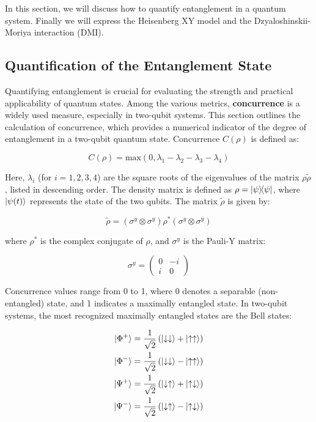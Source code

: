 In this section, 
we will discuss how to quantify 
entanglement in a quantum system.
Finally we will express the Heisenberg XY model   and 
the Dzyaloshinskii-Moriya interaction (DMI).



\subsection{Quantification of the Entanglement State}


Quantifying entanglement is crucial for 
evaluating the strength and practical 
applicability of quantum states. 
Among the various metrics, \textbf{concurrence} \cite{wootters_entanglement_1998}
is a widely used measure, especially in two-qubit 
systems. 
This section outlines the calculation 
of concurrence, which provides a numerical 
indicator of the degree of entanglement 
in a two-qubit quantum state. 
Concurrence \(C(\rho)\) is defined as:

\begin{equation}\label{def: concurrence}
    C(\rho) = \text{max}\left(0, \lambda_1 - 
\lambda_2 - \lambda_3 - \lambda_4\right)
\end{equation}

Here, \(\lambda_i\) (for \(i = 1, 2, 3, 4\)) are the square roots of the eigenvalues 
of the matrix \(\rho \tilde{\rho}\), listed in descending order. 
The density matrix is defined as \(\rho = \ketbra{\psi}{\psi}\),
where \(\ket{\psi(t)}\) represents the state of the two qubits. The matrix \(\tilde{\rho}\) is given by:


\[
\tilde{\rho} = \left(\sigma^y 
\otimes \sigma^y\right) \rho^* 
\left(\sigma^y \otimes \sigma^y\right)
\]

where \(\rho^*\) is the complex conjugate of \(\rho\), and \(\sigma^y\) is the Pauli-Y matrix:

\[
\sigma^y = \begin{pmatrix}
0 & -i \\
i & 0
\end{pmatrix}
\]

Concurrence values range from 0 to 1, 
where 0 denotes a separable (non-entangled) state, 
and 1 indicates a maximally entangled state. In two-qubit systems, 
the most recognized maximally entangled states are the Bell states:


\[
\begin{aligned}
    |\Phi^+\rangle &= \frac{1}{\sqrt{2}} \left( \ket{\downarrow\downarrow} + \ket{\uparrow\uparrow} \right) \\
    |\Phi^-\rangle &= \frac{1}{\sqrt{2}} \left( \ket{\downarrow\downarrow} - \ket{\uparrow\uparrow} \right) \\
    |\Psi^+\rangle &= \frac{1}{\sqrt{2}} \left( \ket{\downarrow\uparrow} + \ket{\uparrow\downarrow} \right) \\
    |\Psi^-\rangle &= \frac{1}{\sqrt{2}} \left( \ket{\downarrow\uparrow} - \ket{\uparrow\downarrow} \right)
\end{aligned}
\]



